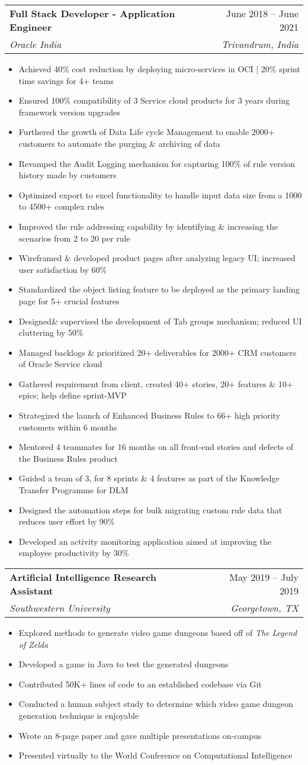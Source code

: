 \documentclass[letterpaper,11pt]{article}
\makeatletter
\newcommand{\resumeItem}[1]{
  \item\small{
    {#1 \vspace{-2pt}}
  }
}
\newcommand{\resumeSubheading}[4]{
  \vspace{-2pt}\item
    \begin{tabular*}{0.97\textwidth}[t]{l@{\extracolsep{\fill}}r}
      \textbf{#1} & #2 \\
      \textit{\small#3} & \textit{\small #4} \\
    \end{tabular*}\vspace{-7pt}
}
\newcommand{\resumeItemListStart}{\begin{itemize}}
\newcommand{\resumeItemListEnd}{\end{itemize}\vspace{-5pt}}
\makeatother
\begin{document}
    \resumeSubheading
      {Full Stack Developer - Application Engineer}{June 2018 -- June 2021}
      {Oracle India}{Trivandrum, India}
      \resumeItemListStart
        	\resumeItem{Achieved 40\% cost reduction by deploying micro-services in OCI | 20\% sprint time savings for 4+ teams}
        	\resumeItem{Ensured 100\% compatibility of 3 Service cloud products for 3 years during framework version upgrades}
        	\resumeItem{Furthered the growth of Data Life cycle Management to enable 2000+ customers to automate the purging \& archiving of data}
	\resumeItem{Revamped the Audit Logging mechanism for capturing 100\% of rule version history made by customers}
	\resumeItem{Optimized export to excel functionality to handle input data size from a 1000 to 4500+ complex rules}
	\resumeItem{Improved the rule addressing capability by identifying \& increasing the scenarios from 2 to 20 per rule}
	\resumeItem{Wireframed \& developed product pages after analyzing legacy UI; increased user satisfaction by 60\%}
	\resumeItem{Standardized the object listing feature to be deployed as the primary landing page for 5+ crucial features}
	\resumeItem{Designed\& supervised the development of Tab groups mechanism; reduced UI cluttering by 50\%}
\resumeItem{Managed backlogs \& prioritized 20+ deliverables for 2000+ CRM customers of Oracle Service cloud}
	\resumeItem{Gathered requirement from client, created 40+ stories, 20+ features \& 10+ epics; help define sprint-MVP}
	\resumeItem{Strategized the launch of Enhanced Business Rules to 66+ high priority customers within 6 months}
\resumeItem{Mentored 4 teammates for 16 months on all front-end stories and defects of the Business Rules product}
	\resumeItem{Guided a team of 3, for 8 sprints \& 4 features as part of the Knowledge Transfer Programme for DLM}
	\resumeItem{Designed the automation steps for bulk migrating custom rule data that reduces user effort by 90\%}
\resumeItem{Developed an activity monitoring application aimed at improving the employee productivity by 30\%}



    \resumeItemListEnd

    \resumeSubheading
      {Artificial Intelligence Research Assistant}{May 2019 -- July 2019}
      {Southwestern University}{Georgetown, TX}
      \resumeItemListStart
        \resumeItem{Explored methods to generate video game dungeons based off of \emph{The Legend of Zelda}}
        \resumeItem{Developed a game in Java to test the generated dungeons}
        \resumeItem{Contributed 50K+ lines of code to an established codebase via Git}
        \resumeItem{Conducted  a human subject study to determine which video game dungeon generation technique is enjoyable}
        \resumeItem{Wrote an 8-page paper and gave multiple presentations on-campus}
        \resumeItem{Presented virtually to the World Conference on Computational Intelligence}
      \resumeItemListEnd
\end{document}
